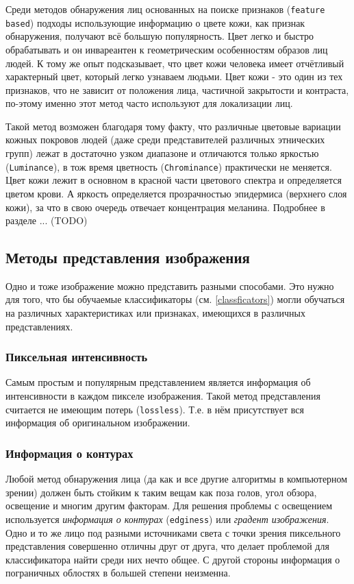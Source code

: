 \documentclass[12pt]{report}
\begin{document}
Среди методов обнаружения лиц основанных на поиске признаков (\texttt{feature based}) подходы использующие информацию о цвете кожи, как признак обнаружения, получают всё большую популярность. Цвет легко и быстро обрабатывать и он инвареантен к геометрическим особенностям образов лиц людей. К тому же опыт подсказывает, что цвет кожи человека имеет отчётливый характерный цвет, который легко узнаваем людьми. \citep{vezhnevets2003survey} Цвет кожи - это один из тех признаков, что не зависит от положения лица, частичной закрытости и контраста, по-этому именно этот метод часто используют для локализации лиц. \citep{ruangyam2009efficient}

Такой метод возможен благодаря тому факту, что различные цветовые вариации кожных покровов людей (даже среди представителей различных этнических групп) лежат в достаточно узком диапазоне и отличаются только яркостью (\texttt{Luminance}), в тож время цветность (\texttt{Chrominance}) практически не меняется. Цвет кожи лежит в основном в красной части цветового спектра и определяется цветом крови. А яркость определяется прозрачностью эпидермиса (верхнего слоя кожи), за что в свою очередь отвечает концентрация меланина. \citep{xu2006color} Подробнее в разделе ... (TODO)

\subsection{Методы представления изображения}
Одно и тоже изображение можно представить разными способами. Это нужно для того, что бы обучаемые классификаторы (см. \ref{classficators}) могли обучаться на различных характеристиках или признаках, имеющихся в различных представлениях. 



\subsubsection{Пиксельная интенсивность}
Самым простым и популярным представлением является информация об интенсивности в каждом пикселе изображения. Такой метод представления считается не имеющим потерь (\texttt{lossless}). Т.е. в нём присутствует  вся информация об оригинальном изображении.\citep{bojkovic2006face}
\subsubsection{Информация о контурах}
Любой метод обнаружения лица (да как и все другие алгоритмы в компьютерном зрении) должен быть стойким к таким вещам как поза голов, угол обзора, освещение и многим другим факторам. 
Для решения проблемы с освещением используется \emph{информация о контурах} (\texttt{edginess}) или \emph{градент изображения}. Одно и то же лицо под разными источниками света с точки зрения пиксельного представления совершенно отличны друг от друга, что делает проблемой для классификатора найти среди них нечто общее. С другой стороны информация о пограничных облостях в большей степени неизменна. \citep{ahmadyfard2008hierarchical}
\end{document}
